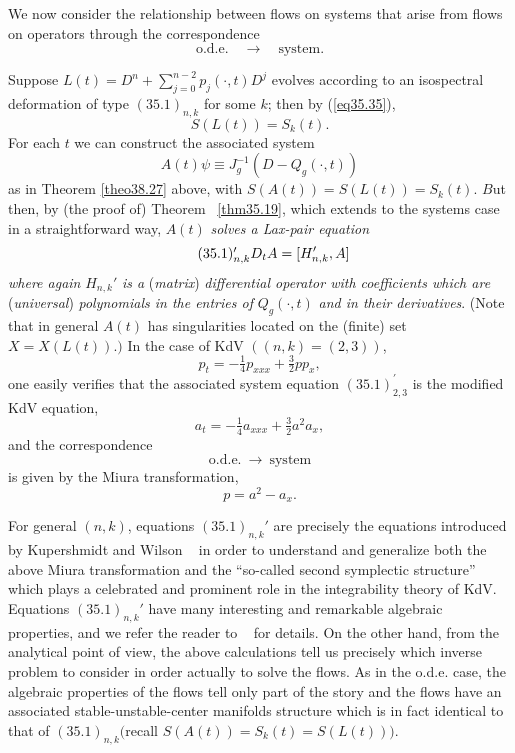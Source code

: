 \documentclass{surv-l}
\theoremstyle{plain}
\theoremstyle{definition}
\numberwithin{equation}{chapter}
\begin{document}
We now consider the relationship between flows on systems that arise from flows on operators through the correspondence
\begin{equation*}
\mathrm{o.d.e}.\quad \rightarrow\quad \mathrm{system}.
\end{equation*}

Suppose $L(t)=D^{n}+\sum_{j=0}^{n-2}p_{j}(\cdot,t)D^{j}$ evolves according to an isospectral deformation of type $(35.1)_{n,k}$ for some $k$; then by (\ref{eq35.35}),
\begin{equation*}
S(L(t))=S_{k}(t).
\end{equation*}
For each $t$ we can construct the associated system
\begin{equation*}
A(t)\psi\equiv J_{g}^{-1}(D-Q_{g}(\cdot, t))
\end{equation*}
as in Theorem \ref{theo38.27} above, with $S(A(t))=S(L(t))=S_{k}(t)$. $B$ut then, by (the proof of) Theorem ~\ref{thm35.19}, which extends to the systems case in a straightforward way, $A(t)$ \emph{solves a Lax-pair equation}
\begin{equation}\label{eq35.1}
 \tag*{(35.1)$^{\prime}_{n,k}$}D_{t}A=[H_{n,k}',A]
\end{equation}
\emph{where again} $H_{n,k}'$ \emph{is a} (\emph{matrix}) \emph{differential operator with coefficients which are} (\emph{universal}) \emph{polynomials in the entries of} $Q_{g}(\cdot, t)$ \emph{and in their derivatives}. (Note that in general $A(t)$ has singularities located on the (finite) set $X=X(L(t)).)$ In the case of KdV $((n,k)=(2,3))$,
\begin{equation*}
p_{t}=-\tfrac{1}{4}p_{xxx}+\tfrac{3}{2}pp_{x},
\end{equation*}
one easily verifies that the associated system equation $(35.1)_{2,3}^{\prime}$ is the modified KdV equation,
\begin{equation*}
a_{t}=-\tfrac{1}{4}a_{xxx}+\tfrac{3}{2}a^{2}a_{x},
\end{equation*}
and the correspondence
\begin{equation*}
\mathrm{o.d.e}.\ \rightarrow\ \mathrm{system}
\end{equation*}
is given by the Miura transformation,
\begin{equation*}
p=a^{2}-a_{x}.
\end{equation*}

For general $(n, k)$, equations $(35.1)_{n,k}'$ are precisely the equations introduced by Kupershmidt and Wilson ~\cite{KW} in order to understand and generalize both the above Miura transformation and the ``so-called second symplectic structure'' which plays a celebrated and prominent role in the integrability theory of KdV. Equations $(35.1)_{n,k}'$ have many interesting and remarkable algebraic properties, and we refer the reader to ~\cite{KW} for details. On the other hand, from the analytical point of view, the above calculations tell us precisely which inverse problem to consider in order actually to solve the flows. As in the o.d.e. case, the algebraic properties of the flows tell only part of the story and the flows have an associated stable-unstable-center manifolds structure which is in fact identical to that of $(35.1)_{n,k} ($recall $S(A(t))=S_{k}(t)=S(L(t)))$.
\end{document}
